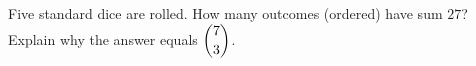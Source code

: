 Five standard dice are rolled. How many outcomes (ordered) have sum $27$? Explain why the answer equals $\dbinom73$.

